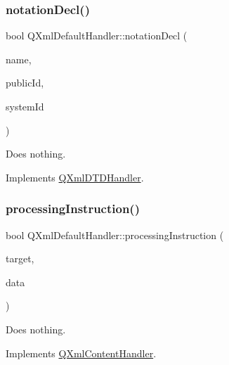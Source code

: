 \mbox{\label{class_q_xml_default_handler_aaa24e258c75cd45e2bd560864b418958}} 
\subsubsection{\texorpdfstring{notationDecl()}{notationDecl()}}
{\footnotesize\ttfamily bool Q\+Xml\+Default\+Handler\+::notation\+Decl (\begin{DoxyParamCaption}\item[{const \mbox{\hyperlink{class_q_string}{Q\+String}} \&}]{name,  }\item[{const \mbox{\hyperlink{class_q_string}{Q\+String}} \&}]{public\+Id,  }\item[{const \mbox{\hyperlink{class_q_string}{Q\+String}} \&}]{system\+Id }\end{DoxyParamCaption})\hspace{0.3cm}{\ttfamily [virtual]}}

Does nothing. 

Implements \mbox{\hyperlink{class_q_xml_d_t_d_handler_a3ce7216b7646cd26bd11c4bdee883507}{Q\+Xml\+D\+T\+D\+Handler}}.

\mbox{\label{class_q_xml_default_handler_afd9bbe78b71f7787e22a3a7555ddba59}} 
\subsubsection{\texorpdfstring{processingInstruction()}{processingInstruction()}}
{\footnotesize\ttfamily bool Q\+Xml\+Default\+Handler\+::processing\+Instruction (\begin{DoxyParamCaption}\item[{const \mbox{\hyperlink{class_q_string}{Q\+String}} \&}]{target,  }\item[{const \mbox{\hyperlink{class_q_string}{Q\+String}} \&}]{data }\end{DoxyParamCaption})\hspace{0.3cm}{\ttfamily [virtual]}}

Does nothing. 

Implements \mbox{\hyperlink{class_q_xml_content_handler_a520c875b64f2f06ec35001a5e50887c3}{Q\+Xml\+Content\+Handler}}.

